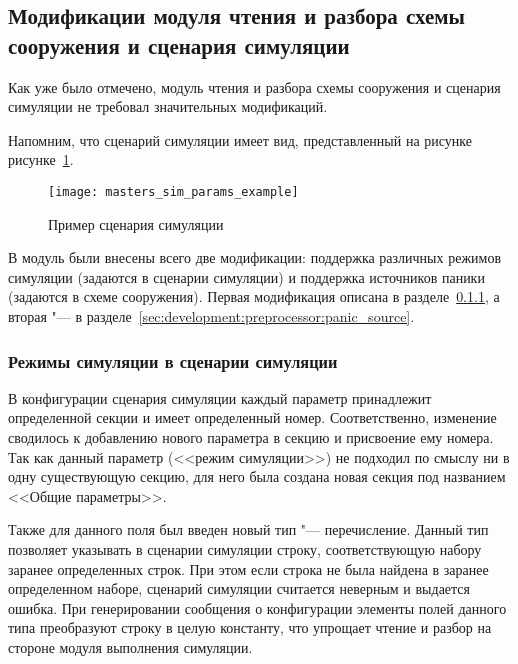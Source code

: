 \subsection{Модификации модуля чтения и разбора схемы сооружения и сценария симуляции}
\label{sec:development:preprocessor}

Как уже было отмечено, модуль чтения и разбора схемы сооружения и сценария симуляции не требовал значительных модификаций.

Напомним, что сценарий симуляции имеет вид, представленный на рисунке рисунке~\ref{sec:development:preprocessor:scenario_dsl_listing}.

\begin{figure}[ht!]
  \centering
  \texttt{[image: masters\_sim\_params\_example]}
  \caption{Пример сценария симуляции}
  \label{sec:development:preprocessor:scenario_dsl_listing}
\end{figure}

В модуль были внесены всего две модификации: поддержка различных режимов симуляции (задаются в сценарии симуляции) и поддержка источников паники (задаются в схеме сооружения).
Первая модификация описана в разделе~\ref{sec:development:preprocessor:escape}, а вторая "--- в разделе~\ref{sec:development:preprocessor:panic_source}.

\subsubsection{Режимы симуляции в сценарии симуляции}
\label{sec:development:preprocessor:escape}

В конфигурации сценария симуляции каждый параметр принадлежит определенной секции и имеет определенный номер.
Соответственно, изменение сводилось к добавлению нового параметра в секцию и присвоение ему номера.
Так как данный параметр (<<режим симуляции>>) не подходил по смыслу ни в одну существующую секцию,
для него была создана новая секция под названием <<Общие параметры>>.

Также для данного поля был введен новый тип "--- перечисление.
Данный тип позволяет указывать в сценарии симуляции строку, соответствующую набору заранее определенных строк.
При этом если строка не была найдена в заранее определенном наборе, сценарий симуляции считается неверным и выдается ошибка.
При генерировании сообщения о конфигурации элементы полей данного типа преобразуют строку в целую константу, что упрощает чтение и разбор на стороне модуля выполнения симуляции.

